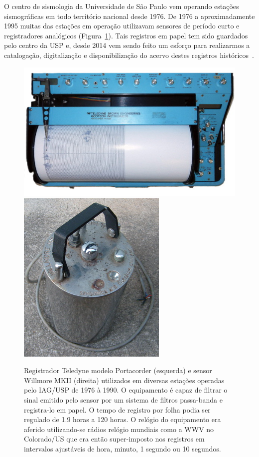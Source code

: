\documentclass{article}
\begin{document}
O centro de sismologia da Universidade de São Paulo vem operando
estações sismográficas em todo território nacional desde 1976. De 1976
a aproximadamente 1995 muitas das estações em operação utilizavam
sensores de período curto e registradores analógicos (Figura~\ref{teledyne}). Tais
registros em papel tem sido guardados pelo centro da USP e, desde 2014
vem sendo feito um esforço para realizarmos a catalogação,
digitalização e disponibilização do acervo destes registros
históricos~\cite{dados-raros}.
\begin{figure}
\begin{center}
\includegraphics[scale=0.35]{registrador.png}
\includegraphics[scale=0.35]{sensor.png}
\caption{Registrador Teledyne modelo Portacorder (esquerda) e sensor
  Willmore MKII (direita) utilizados em diversas estações operadas
  pelo IAG/USP de 1976 à 1990. O equipamento é capaz de filtrar o
  sinal emitido pelo sensor por um sistema de filtros passa-banda e
  registra-lo em papel. O tempo de registro por folha podia ser
  regulado de 1.9 horas a 120 horas. O relógio do equipamento era
  aferido utilizando-se rádios relógio mundiais como a WWV no
  Colorado/US que era então super-imposto nos registros em intervalos
  ajustáveis de hora, minuto, 1 segundo ou 10 segundos.}
\label{teledyne}
\end{center}
\end{figure}
\end{document}
